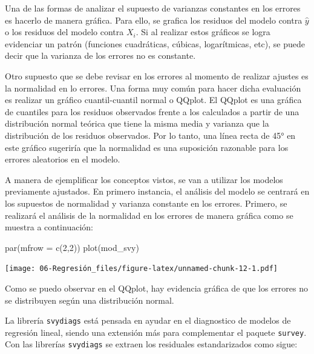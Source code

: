 \documentclass[
  12pt,
]{book}
\newenvironment{Shaded}{\begin{snugshade}}{\end{snugshade}}
\newcommand{\AttributeTok}[1]{\textcolor[rgb]{0.77,0.63,0.00}{#1}}
\newcommand{\DecValTok}[1]{\textcolor[rgb]{0.00,0.00,0.81}{#1}}
\newcommand{\FunctionTok}[1]{\textcolor[rgb]{0.00,0.00,0.00}{#1}}
\newcommand{\NormalTok}[1]{#1}
\newcommand{\OtherTok}[1]{\textcolor[rgb]{0.56,0.35,0.01}{#1}}
\newcommand{\SpecialCharTok}[1]{\textcolor[rgb]{0.00,0.00,0.00}{#1}}
\begin{document}
Una de las formas de analizar el supuesto de varianzas constantes en los errores es hacerlo de manera gráfica. Para ello, se grafica los residuos del modelo contra \(\hat{y}\) o los residuos del modelo contra \(X_{i}\). Si al realizar estos gráficos se logra evidenciar un patrón (funciones cuadráticas, cúbicas, logarítmicas, etc), se puede decir que la varianza de los errores no es constante.

Otro supuesto que se debe revisar en los errores al momento de realizar ajustes es la normalidad en lo errores. Una forma muy común para hacer dicha evaluación es realizar un gráfico cuantil-cuantil normal o QQplot. El QQplot es una gráfica de cuantiles para los residuos observados frente a los calculados a partir de una distribución normal teórica que tiene la misma media y varianza que la distribución de los residuos observados. Por lo tanto, una línea recta de 45° en este gráfico sugeriría que la normalidad es una suposición razonable para los errores aleatorios en el modelo.

A manera de ejemplificar los conceptos vistos, se van a utilizar los modelos previamente ajustados. En primero instancia, el análisis del modelo se centrará en los supuestos de normalidad y varianza constante en los errores. Primero, se realizará el análisis de la normalidad en los errores de manera gráfica como se muestra a continuación:

\begin{Shaded}
\begin{Highlighting}[]
\FunctionTok{par}\NormalTok{(}\AttributeTok{mfrow =} \FunctionTok{c}\NormalTok{(}\DecValTok{2}\NormalTok{,}\DecValTok{2}\NormalTok{))}
\FunctionTok{plot}\NormalTok{(mod\_svy)}
\end{Highlighting}
\end{Shaded}

\texttt{[image: 06-Regresión\_files/figure-latex/unnamed-chunk-12-1.pdf]}

Como se puedo observar en el QQplot, hay evidencia gráfica de que los errores no se distribuyen según una distribución normal.

La librería \texttt{svydiags} está pensada en ayudar en el diagnostico de modelos de regresión lineal, siendo una extensión más para complementar el paquete \texttt{survey}. Con las librerías \texttt{svydiags} se extraen los residuales estandarizados como sigue:

\begin{Shaded}
\end{Shaded}
\end{document}
